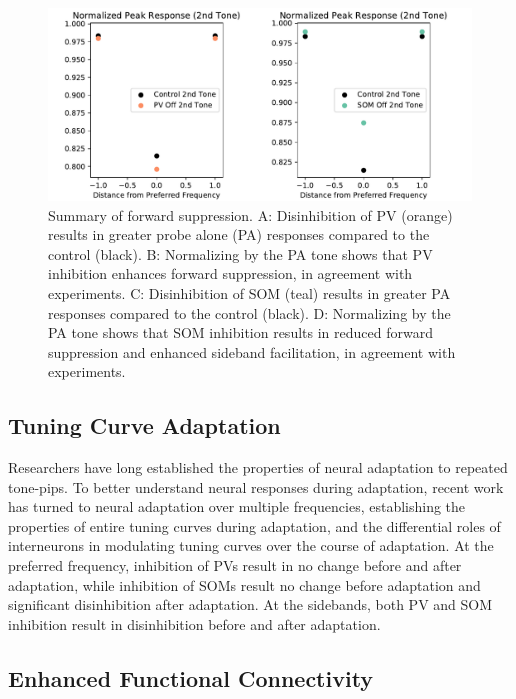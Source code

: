 \documentclass[a4paper,10pt]{article}
\begin{document}
\begin{figure}[ht!]
 \centering
 \includegraphics[width=\textwidth]{fs.pdf}
 \caption{Summary of forward suppression. A: Disinhibition of PV (orange) results in greater probe alone (PA) responses compared to the control (black). B: Normalizing by the PA tone shows that PV inhibition enhances forward suppression, in agreement with experiments. C: Disinhibition of SOM (teal) results in greater PA responses compared to the control (black). D: Normalizing by the PA tone shows that SOM inhibition results in reduced forward suppression and enhanced sideband facilitation, in agreement with experiments.}\label{fig:fs}
\end{figure}


\subsection{Tuning Curve Adaptation}

Researchers have long established the properties of neural adaptation to repeated tone-pips. To better understand neural responses during adaptation, recent work has turned to neural adaptation over multiple frequencies, establishing the properties of entire tuning curves during adaptation, and the differential roles of interneurons in modulating tuning curves over the course of adaptation. At the preferred frequency, inhibition of PVs result in no change before and after adaptation, while inhibition of SOMs result no change before adaptation and significant disinhibition after adaptation. At the sidebands, both PV and SOM inhibition result in disinhibition before and after adaptation.

\subsection{Enhanced Functional Connectivity}
\end{document}
